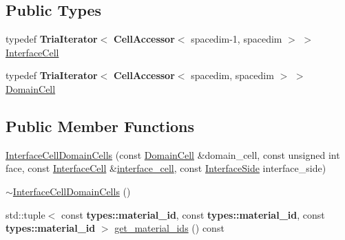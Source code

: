 \subsection*{Public Types}
\begin{DoxyCompactItemize}
\item 
typedef {\bf Tria\+Iterator}$<$ {\bf Cell\+Accessor}$<$ spacedim-\/1, spacedim $>$ $>$ \hyperlink{class_interface_cell_domain_cells_ac6c8ada1cde14364575ef0191a278bf8}{Interface\+Cell}
\item 
typedef {\bf Tria\+Iterator}$<$ {\bf Cell\+Accessor}$<$ spacedim, spacedim $>$ $>$ \hyperlink{class_interface_cell_domain_cells_aea8f8f65d0f5021da9c5b8e147b6d587}{Domain\+Cell}
\end{DoxyCompactItemize}
\subsection*{Public Member Functions}
\begin{DoxyCompactItemize}
\item 
\hyperlink{class_interface_cell_domain_cells_a016b875566033b0da13d774081eaeaf4}{Interface\+Cell\+Domain\+Cells} (const \hyperlink{class_interface_cell_domain_cells_aea8f8f65d0f5021da9c5b8e147b6d587}{Domain\+Cell} \&domain\+\_\+cell, const unsigned int face, const \hyperlink{class_interface_cell_domain_cells_ac6c8ada1cde14364575ef0191a278bf8}{Interface\+Cell} \&\hyperlink{class_interface_cell_domain_cells_acabc5a62be3f7742c3c334ae1777fbd5}{interface\+\_\+cell}, const \hyperlink{triangulation__system_8h_a44f3c00e36c1d6e3c389ae693c09b435}{Interface\+Side} interface\+\_\+side)
\item 
\hyperlink{class_interface_cell_domain_cells_a7dae568b2d3c80762d0e1af52c93f279}{$\sim$\+Interface\+Cell\+Domain\+Cells} ()
\item 
std\+::tuple$<$ const {\bf types\+::material\+\_\+id}, const {\bf types\+::material\+\_\+id}, const {\bf types\+::material\+\_\+id} $>$ \hyperlink{class_interface_cell_domain_cells_a9b5388da2f3a61d4340ae4d1b979d6d1}{get\+\_\+material\+\_\+ids} () const 
\end{DoxyCompactItemize}
